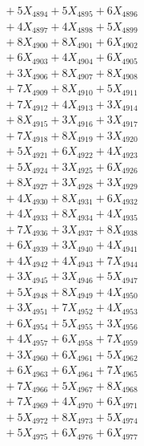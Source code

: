 \documentclass[a4paper,10pt]{article}
\begin{document}
{\begin{align}
&\;  + 5 X_{4894} + 5 X_{4895} + 6 X_{4896} \\[0.3ex]
&\;  + 4 X_{4897} + 4 X_{4898} + 5 X_{4899} \\[0.5ex]\allowbreak
&\;  + 8 X_{4900} + 8 X_{4901} + 6 X_{4902} \\[0.3ex]
&\;  + 6 X_{4903} + 4 X_{4904} + 6 X_{4905} \\[0.3ex]
&\;  + 3 X_{4906} + 8 X_{4907} + 8 X_{4908} \\[0.3ex]
&\;  + 7 X_{4909} + 8 X_{4910} + 5 X_{4911} \\[0.3ex]
&\;  + 7 X_{4912} + 4 X_{4913} + 3 X_{4914} \\[0.3ex]
&\;  + 8 X_{4915} + 3 X_{4916} + 3 X_{4917} \\[0.3ex]
&\;  + 7 X_{4918} + 8 X_{4919} + 3 X_{4920} \\[0.3ex]
&\;  + 5 X_{4921} + 6 X_{4922} + 4 X_{4923} \\[0.3ex]
&\;  + 5 X_{4924} + 3 X_{4925} + 6 X_{4926} \\[0.3ex]
&\;  + 8 X_{4927} + 3 X_{4928} + 3 X_{4929} \\[0.5ex]\allowbreak
&\;  + 4 X_{4930} + 8 X_{4931} + 6 X_{4932} \\[0.3ex]
&\;  + 4 X_{4933} + 8 X_{4934} + 4 X_{4935} \\[0.3ex]
&\;  + 7 X_{4936} + 3 X_{4937} + 8 X_{4938} \\[0.3ex]
&\;  + 6 X_{4939} + 3 X_{4940} + 4 X_{4941} \\[0.3ex]
&\;  + 4 X_{4942} + 4 X_{4943} + 7 X_{4944} \\[0.3ex]
&\;  + 3 X_{4945} + 3 X_{4946} + 5 X_{4947} \\[0.3ex]
&\;  + 5 X_{4948} + 8 X_{4949} + 4 X_{4950} \\[0.3ex]
&\;  + 3 X_{4951} + 7 X_{4952} + 4 X_{4953} \\[0.3ex]
&\;  + 6 X_{4954} + 5 X_{4955} + 3 X_{4956} \\[0.3ex]
&\;  + 4 X_{4957} + 6 X_{4958} + 7 X_{4959} \\[0.5ex]\allowbreak
&\;  + 3 X_{4960} + 6 X_{4961} + 5 X_{4962} \\[0.3ex]
&\;  + 6 X_{4963} + 6 X_{4964} + 7 X_{4965} \\[0.3ex]
&\;  + 7 X_{4966} + 5 X_{4967} + 8 X_{4968} \\[0.3ex]
&\;  + 7 X_{4969} + 4 X_{4970} + 6 X_{4971} \\[0.3ex]
&\;  + 5 X_{4972} + 8 X_{4973} + 5 X_{4974} \\[0.3ex]
&\;  + 5 X_{4975} + 6 X_{4976} + 6 X_{4977} \\[0.3ex]

\end{align}}
\end{document}
